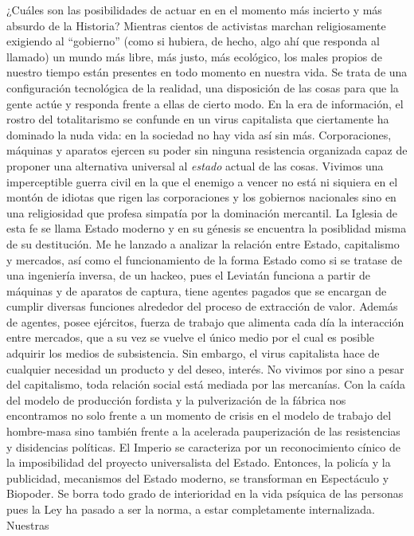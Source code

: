 \documentclass[
]{article}
\begin{document}
¿Cuáles son las posibilidades de actuar en en el momento más incierto y
más absurdo de la Historia? Mientras cientos de activistas marchan
religiosamente exigiendo al ``gobierno'' (como si hubiera, de hecho,
algo ahí que responda al llamado) un mundo más libre, más justo, más
ecológico, los males propios de nuestro tiempo están presentes en todo
momento en nuestra vida. Se trata de una configuración tecnológica de la
realidad, una disposición de las cosas para que la gente actúe y
responda frente a ellas de cierto modo. En la era de información, el
rostro del totalitarismo se confunde en un virus capitalista que
ciertamente ha dominado la nuda vida: en la sociedad no hay vida así sin
más. Corporaciones, máquinas y aparatos ejercen su poder sin ninguna
resistencia organizada capaz de proponer una alternativa universal al
\emph{estado} actual de las cosas. Vivimos una imperceptible guerra
civil en la que el enemigo a vencer no está ni siquiera en el montón de
idiotas que rigen las corporaciones y los gobiernos nacionales sino en
una religiosidad que profesa simpatía por la dominación mercantil. La
Iglesia de esta fe se llama Estado moderno y en su génesis se encuentra
la posiblidad misma de su destitución. Me he lanzado a analizar la
relación entre Estado, capitalismo y mercados, así como el
funcionamiento de la forma Estado como si se tratase de una ingeniería
inversa, de un hackeo, pues el Leviatán funciona a partir de máquinas y
de aparatos de captura, tiene agentes pagados que se encargan de cumplir
diversas funciones alrededor del proceso de extracción de valor. Además
de agentes, posee ejércitos, fuerza de trabajo que alimenta cada día la
interacción entre mercados, que a su vez se vuelve el único medio por el
cual es posible adquirir los medios de subsistencia. Sin embargo, el
virus capitalista hace de cualquier necesidad un producto y del deseo,
interés. No vivimos por sino a pesar del capitalismo, toda relación
social está mediada por las mercanías. Con la caída del modelo de
producción fordista y la pulverización de la fábrica nos encontramos no
solo frente a un momento de crisis en el modelo de trabajo del
hombre-masa sino también frente a la acelerada pauperización de las
resistencias y disidencias políticas. El Imperio se caracteriza por un
reconocimiento cínico de la imposibilidad del proyecto universalista del
Estado. Entonces, la policía y la publicidad, mecanismos del Estado
moderno, se transforman en Espectáculo y Biopoder. Se borra todo grado
de interioridad en la vida psíquica de las personas pues la Ley ha
pasado a ser la norma, a estar completamente internalizada. Nuestras
\end{document}
